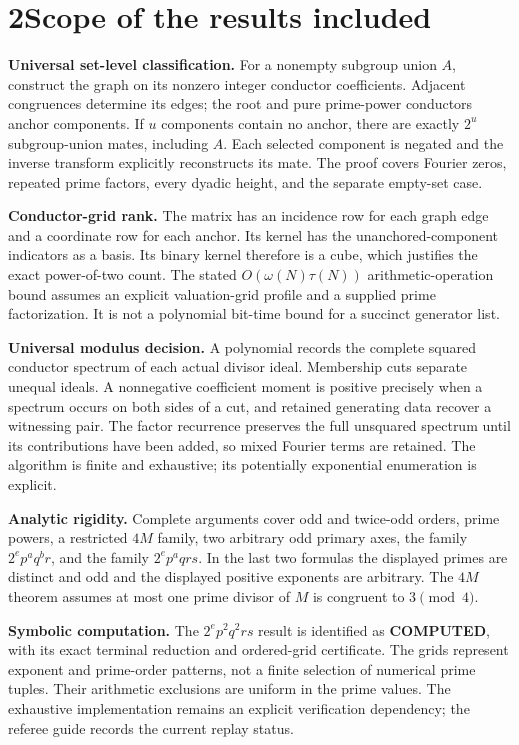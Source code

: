 \documentclass[10pt]{article}
\begin{document}
\clearpage
\section*{2\quad Scope of the results included}

\textbf{Universal set-level classification.} For a nonempty subgroup union $A$, construct the graph on its nonzero integer conductor coefficients. Adjacent congruences determine its edges; the root and pure prime-power conductors anchor components. If $u$ components contain no anchor, there are exactly $2^u$ subgroup-union mates, including $A$. Each selected component is negated and the inverse transform explicitly reconstructs its mate. The proof covers Fourier zeros, repeated prime factors, every dyadic height, and the separate empty-set case.

\textbf{Conductor-grid rank.} The matrix has an incidence row for each graph edge and a coordinate row for each anchor. Its kernel has the unanchored-component indicators as a basis. Its binary kernel therefore is a cube, which justifies the exact power-of-two count. The stated $O(\omega(N)\tau(N))$ arithmetic-operation bound assumes an explicit valuation-grid profile and a supplied prime factorization. It is not a polynomial bit-time bound for a succinct generator list.

\textbf{Universal modulus decision.} A polynomial records the complete squared conductor spectrum of each actual divisor ideal. Membership cuts separate unequal ideals. A nonnegative coefficient moment is positive precisely when a spectrum occurs on both sides of a cut, and retained generating data recover a witnessing pair. The factor recurrence preserves the full unsquared spectrum until its contributions have been added, so mixed Fourier terms are retained. The algorithm is finite and exhaustive; its potentially exponential enumeration is explicit.

\textbf{Analytic rigidity.} Complete arguments cover odd and twice-odd orders, prime powers, a restricted $4M$ family, two arbitrary odd primary axes, the family $2^e p^a q^b r$, and the family $2^e p^a qrs$. In the last two formulas the displayed primes are distinct and odd and the displayed positive exponents are arbitrary. The $4M$ theorem assumes at most one prime divisor of $M$ is congruent to $3\pmod4$.

\textbf{Symbolic computation.} The $2^e p^2q^2rs$ result is identified as \textbf{COMPUTED}, with its exact terminal reduction and ordered-grid certificate. The grids represent exponent and prime-order patterns, not a finite selection of numerical prime tuples. Their arithmetic exclusions are uniform in the prime values. The exhaustive implementation remains an explicit verification dependency; the referee guide records the current replay status.
\end{document}
